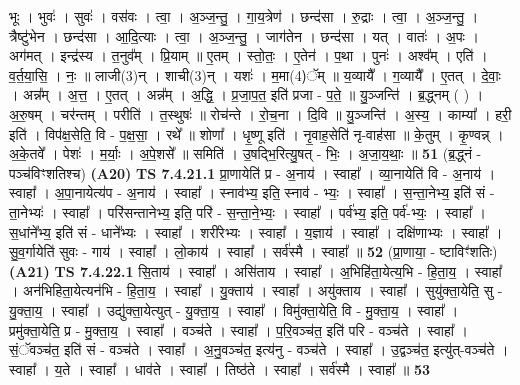 \documentclass[17pt]{extarticle}
\begin{document}
                  भूः । भुवः॑ । सुवः॑ । वस॑वः । त्वा॒ । अ॒ञ्ज॒न्तु॒ । गा॒य॒त्रेण॑ । छन्द॑सा । रु॒द्राः । त्वा॒ । अ॒ञ्ज॒न्तु॒ । त्रैष्टु॑भेन । छन्द॑सा । आ॒दि॒त्याः । त्वा॒ । अ॒ञ्ज॒न्तु॒ । जाग॑तेन । छन्द॑सा । यत् । वातः॑ । अ॒पः । अग॑मत् । इन्द्र॑स्य । त॒नुव᳚म् । प्रि॒याम् ॥ ए॒तम् । स्तो॒तः॒ । ए॒तेन॑ । प॒था । पुनः॑ । अश्व᳚म् । एति॑ । व॒र्त॒या॒सि॒ । नः॒ ॥ लाजी(3)न् । शाची(3)न् । यशः॑ । म॒मा(4)ॅम् ॥ य॒व्यायै᳚ । ग॒व्यायै᳚ । ए॒तत् । दे॒वाः॒ । अन्न᳚म् । अ॒त्त॒ । ए॒तत् । अन्न᳚म् । अ॒द्धि॒ । प्र॒जा॒प॒त॒ इति॑ प्रजा - प॒ते॒ ॥ यु॒ञ्जन्ति॑ । ब्र॒द्ध्नम् ( ) । अ॒रु॒षम् । चर॑न्तम् । परीति॑ । त॒स्थुषः॑ ॥ रोच॑न्ते । रो॒च॒ना । दि॒वि ॥ यु॒ञ्जन्ति॑ । अ॒स्य॒ । काम्या᳚ । हरी॒ इति॑ । विप॑क्ष॒सेति॒ वि - प॒क्ष॒सा॒ । रथे᳚ ॥ शोणा᳚ । धृ॒ष्णू इति॑ । नृ॒वाह॒सेति॑ नृ-वाह॑सा ॥ के॒तुम् । कृ॒ण्वन्न् । अ॒के॒तवे᳚ । पेशः॑ । म॒र्याः॒ । अ॒पे॒शसे᳚ ॥ समिति॑ । उ॒षद्भि॒रित्यु॒षत् - भिः॒ । अ॒जा॒य॒थाः॒ ॥ \textbf{  51} \newline
                  \newline
                      (ब्र॒द्ध्नं - पञ्च॑विꣳशतिश्च)  \textbf{(A20)} \newline \newline
                                \textbf{ TS 7.4.21.1} \newline
                  प्रा॒णायेति॑ प्र - अ॒नाय॑ । स्वाहा᳚ । व्या॒नायेति॑ वि - अ॒नाय॑ । स्वाहा᳚ । अ॒पा॒नायेत्य॑प - अ॒नाय॑ । स्वाहा᳚ । स्नाव॑भ्य॒ इति॒ स्नाव॑ - भ्यः॒ । स्वाहा᳚ । स॒न्ता॒नेभ्य॒ इति॑ सं - ता॒नेभ्यः॑ । स्वाहा᳚ । परि॑सन्तानेभ्य॒ इति॒ परि॑ - स॒न्ता॒ने॒भ्यः॒ । स्वाहा᳚ । पर्व॑भ्य॒ इति॒ पर्व॑-भ्यः॒ । स्वाहा᳚ । स॒धांने᳚भ्य॒ इति॑ सं - धाने᳚भ्यः । स्वाहा᳚ । शरी॑रेभ्यः । स्वाहा᳚ । य॒ज्ञाय॑ । स्वाहा᳚ । दक्षि॑णाभ्यः । स्वाहा᳚ । सु॒व॒र्गायेति॑ सुवः - गाय॑ । स्वाहा᳚ । लो॒काय॑ । स्वाहा᳚ । सर्व॑स्मै । स्वाहा᳚ ॥ \textbf{  52} \newline
                  \newline
                      (प्रा॒णाया॒ - ष्टाविꣳ॑शतिः)  \textbf{(A21)} \newline \newline
                                \textbf{ TS 7.4.22.1} \newline
                  सि॒ताय॑ । स्वाहा᳚ । असि॑ताय । स्वाहा᳚ । अ॒भिहि॑ता॒येत्य॒भि - हि॒ता॒य॒ । स्वाहा᳚ । अन॑भिहिता॒येत्यन॑भि - हि॒ता॒य॒ । स्वाहा᳚ । यु॒क्ताय॑ । स्वाहा᳚ । अयु॑क्ताय । स्वाहा᳚ । सुयु॑क्ता॒येति॒ सु - यु॒क्ता॒य॒ । स्वाहा᳚ । उद्यु॑क्ता॒येत्युत् - यु॒क्ता॒य॒ । स्वाहा᳚ । विमु॑क्ता॒येति॒ वि - मु॒क्ता॒य॒ । स्वाहा᳚ । प्रमु॑क्ता॒येति॒ प्र - मु॒क्ता॒य॒ । स्वाहा᳚ । वञ्च॑ते । स्वाहा᳚ । प॒रि॒वञ्च॑त॒ इति॑ परि - वञ्च॑ते । स्वाहा᳚ । सं॒ॅवञ्च॑त॒ इति॑ सं - वञ्च॑ते । स्वाहा᳚ । अ॒नु॒वञ्च॑त॒ इत्य॑नु - वञ्च॑ते । स्वाहा᳚ । उ॒द्वञ्च॑त॒ इत्यु॑त्-वञ्च॑ते । स्वाहा᳚ । य॒ते । स्वाहा᳚ । धाव॑ते । स्वाहा᳚ । तिष्ठ॑ते । स्वाहा᳚ । सर्व॑स्मै । स्वाहा᳚ ॥ \textbf{  53} \newline
\end{document}

